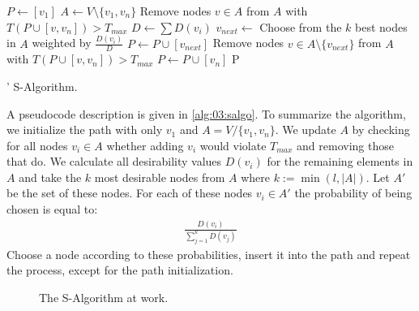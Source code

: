 \begin{algorithm}
	\begin{algorithmic}[lines]
		\State $P \leftarrow [v_1]$
		\State $A \leftarrow V \setminus \{v_1, v_n\}$ 
		\State Remove nodes $v \in A$ from $A$ with $T(P \cup [v, v_n]) > T_{max}$
		\State $D \leftarrow \sum D(v_i)$
		\State $v_{next} \leftarrow$ Choose from the $k$ best nodes in $A$ weighted by $\frac{D(v_i)}{D}$
		\State $P \leftarrow P \cup [v_{next}]$
		\State Remove nodes $v \in A \setminus \{v_{next}\}$ from $A$ with $T(P \cup [v, v_n]) > T_{max}$
		\EndWhile
		\State $P \leftarrow P \cup [v_n]$
		\State \Return P
		\EndFunction
	\end{algorithmic}
	\caption{\citeauthor{tsiligiridis_heuristic_1984}' S-Algorithm.}
	\label{alg:03:salgo}
\end{algorithm}

A pseudocode description is given in \cref{alg:03:salgo}.
To summarize the algorithm, we initialize the path with only $v_1$ and $A = V / \{v_1, v_n\}$.
We update $A$ by checking for all nodes $v_i \in A$ whether adding $v_i$ would violate $T_{max}$ and removing those that do.
We calculate all desirability values $D(v_i)$ for the remaining elements in $A$ and take the $k$ most desirable nodes from $A$ where $k := \min(l, |A|)$. Let $A'$ be the set of these nodes.
For each of these nodes $v_i \in A'$ the probability of being chosen is equal to:
\begin{align*}
	\frac{D(v_i)}{\sum_{j=1}^k D(v_j)}
\end{align*}
Choose a node according to these probabilities, insert it into the path and repeat the process, except for the path initialization.

\begin{wrapfigure}{r}{5cm}
	\centering
	\caption{The S-Algorithm at work.}
	\label{fig:03:salgoexample}
\end{wrapfigure}


